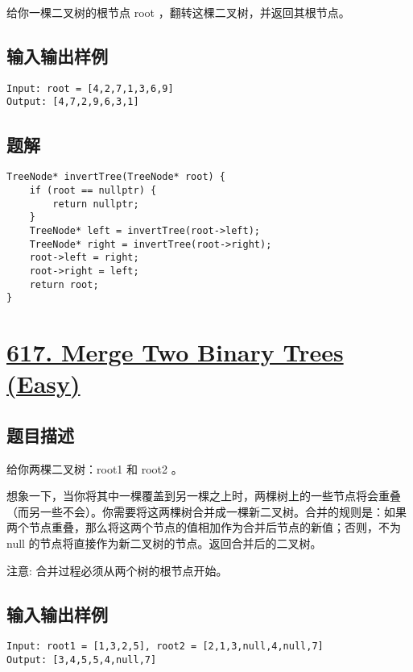 \documentclass[lang=cn,10pt]{elegantbook}
\begin{document}
给你一棵二叉树的根节点 root ，翻转这棵二叉树，并返回其根节点。

\subsection*{输入输出样例}

\begin{lstlisting}
Input: root = [4,2,7,1,3,6,9]
Output: [4,7,2,9,6,3,1]
\end{lstlisting}

\subsection*{题解}

\begin{lstlisting}
TreeNode* invertTree(TreeNode* root) {
	if (root == nullptr) {
		return nullptr;
	}
	TreeNode* left = invertTree(root->left);
	TreeNode* right = invertTree(root->right);
	root->left = right;
	root->right = left;
	return root;
}
\end{lstlisting}

{\color{red}\section{\href{https://leetcode.cn/problems/merge-two-binary-trees/}{617. Merge Two Binary Trees (Easy)}}} \label{ch14.617}

\subsection*{题目描述}

给你两棵二叉树：root1 和 root2 。

想象一下，当你将其中一棵覆盖到另一棵之上时，两棵树上的一些节点将会重叠（而另一些不会）。你需要将这两棵树合并成一棵新二叉树。合并的规则是：如果两个节点重叠，那么将这两个节点的值相加作为合并后节点的新值；否则，不为 null 的节点将直接作为新二叉树的节点。返回合并后的二叉树。

注意: 合并过程必须从两个树的根节点开始。

\subsection*{输入输出样例}

\begin{lstlisting}
Input: root1 = [1,3,2,5], root2 = [2,1,3,null,4,null,7]
Output: [3,4,5,5,4,null,7]
\end{lstlisting}
\end{document}
